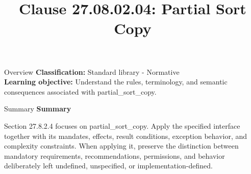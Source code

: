 \documentclass[10pt,letterpaper]{article}
\title{Clause 27.08.02.04: Partial Sort Copy}
\author{}
\date{}
\begin{document}
\maketitle
\begin{CornellOverviewBox}{Overview}
\textbf{Classification:} Standard library - Normative\\[2pt]
\textbf{Learning objective:} Understand the rules, terminology, and semantic consequences associated with partial\_sort\_copy.
\end{CornellOverviewBox}\begin{CornellSummaryBox}{Summary}
{\sffamily\bfseries\color{Accent} Summary}\par\vspace{3pt}Section 27.8.2.4 focuses on partial\_sort\_copy. Apply the specified interface together with its mandates, effects, result conditions, exception behavior, and complexity constraints. When applying it, preserve the distinction between mandatory requirements, recommendations, permissions, and behavior deliberately left undefined, unspecified, or implementation-defined.
\end{CornellSummaryBox}
\end{document}
